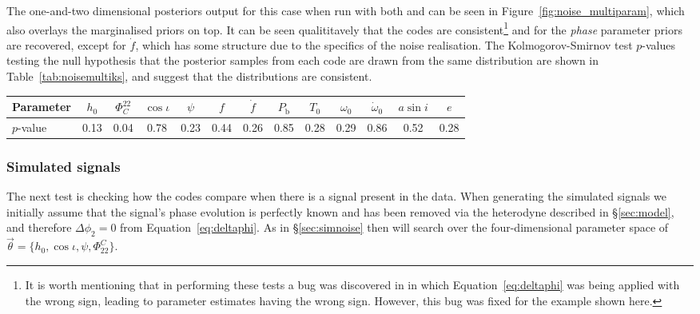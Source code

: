 The one-and-two dimensional posteriors output for this case when run with both \lppe and \lppen can be seen in Figure~\ref{fig:noise_multiparam},
which also overlays the marginalised priors on top. It can be seen qualititavely that the codes are consistent\footnote{It is worth mentioning that in performing
these tests a bug was discovered in \lppe in which Equation~\ref{eq:deltaphi} was being applied with the wrong sign, leading to parameter estimates
having the wrong sign. However, this bug was fixed for the example shown here.} and for the {\it phase} parameter priors are recovered, except for
$\dot{f}$, which has some structure due to the specifics of the noise realisation. The Kolmogorov-Smirnov test $p$-values testing the null hypothesis
that the posterior samples from each code are drawn from the same distribution are shown in Table~\ref{tab:noisemultiks}, and suggest that the
distributions are consistent.

\begin{table*}[hptb]
\caption{Kolmogorov-Smirnov test $p$-values testing the null hypothesis that the samples output by \lppen and \lppe, when running on simulated
noise data and searching over the twelve parameters $\{h_0, \cos{\iota}, \psi, \Phi_{22}^C, f,\dot{f},P_{\text{b}}, T_0, \omega_0, \dot{\omega}_0, a\sin{i}, e\}$,
are drawn from the same distributions.\label{tab:noisemultiks}}
\begin{center}
\begin{tabular}{l | c c c c c c c c c c c c}
\hline
Parameter & $h_0$ & $\Phi_C^{22}$ & $\cos{\iota}$ & $\psi$ & $f$ & $\dot{f}$ & $P_{\text{b}}$ & $T_0$ & $\omega_0$ & $\dot{\omega}_0$ & $a\sin{i}$ & $e$ \\                      
\hline
\hline
$p$-value  & 0.13 & 0.04 & 0.78 & 0.23 & 0.44 & 0.26 & 0.85 & 0.28 & 0.29 & 0.86 & 0.52 & 0.28 \\
\hline
\end{tabular}
\end{center}
\end{table*}

\subsubsection{Simulated signals}\label{sec:simsignal}

The next test is checking how the codes compare when there is a signal present in the data. When generating the simulated signals we initially
assume that the signal's phase evolution is perfectly known and has been removed via the heterodyne described in \S\ref{sec:model}, and therefore
$\Delta\phi_2 = 0$ from Equation~\ref{eq:deltaphi}. As in \S\ref{sec:simnoise} then will search over the four-dimensional parameter space of
$\vec{\theta} = \{h_0, \cos{\iota}, \psi, \Phi_{22}^C\}$.


